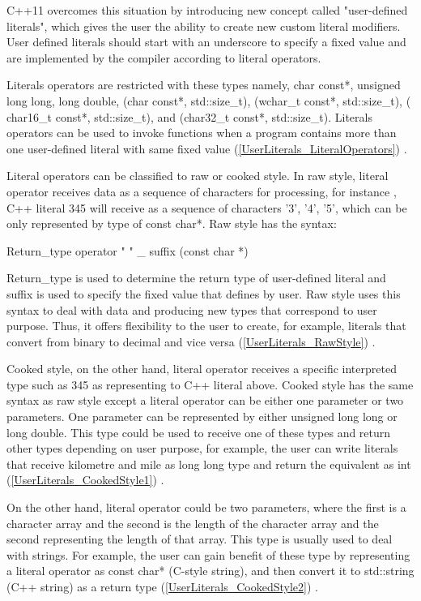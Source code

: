 \documentclass[11pt]{report}
\begin{document}
C++11 overcomes this situation by introducing new concept called "user-defined literals", which gives the user the ability to create new custom literal modifiers. User defined literals should start with an underscore to specify a fixed value and are implemented by the compiler according to literal operators.


Literals operators are restricted with these types namely, char const*, unsigned long long, long double, (char const*, std::size\_t), (wchar\_t const*, std::size\_t), ( char16\_t const*, std::size\_t), and (char32\_t const*, std::size\_t). Literals operators can be used to invoke functions when a program contains more than one user-defined literal with same fixed value (\ref{UserLiterals_LiteralOperators}) \cite{Gregorie:professionalcpp}.


Literal operators can be classified to raw or cooked style. In raw style, literal operator receives data as a sequence of characters for processing, for instance , C++ literal 345 will receive as a sequence of characters '3', '4', '5', which can be only represented by type of  const char*. Raw style has the syntax:
\begin{center}
Return\_type  operator " " \_ suffix (const char *)
\end{center}

Return\_type is used to determine the return type of user-defined literal and suffix is used to specify the fixed value that defines by user. Raw style uses this syntax to deal with data and producing new types that correspond to user purpose.  Thus, it offers flexibility to the user to create, for example, literals that convert from binary to decimal and vice versa (\ref{UserLiterals_RawStyle}) \cite{Gregorie:professionalcpp}.


Cooked style, on the other hand, literal operator receives a specific interpreted type such as 345 as representing to C++ literal above. Cooked style has the same syntax as raw style except a literal operator can be either one parameter or two parameters. One parameter can be represented by either unsigned long long or long double. This type could be used to receive one of these types and return other types depending on user purpose, for example, the user can write literals that receive kilometre and mile as long long type and return the equivalent as int (\ref{UserLiterals_CookedStyle1}) \cite{Gregorie:professionalcpp}.


On the other hand, literal operator could be two parameters, where the first is a character array and the second is the length of the character array and the second representing the length of that array. This type is usually used to deal with strings. For example, the user can gain benefit of these type by representing a literal operator as const char* (C-style string), and then convert it to std::string (C++ string) as a return type (\ref{UserLiterals_CookedStyle2}) \cite{Gregorie:professionalcpp}.
\end{document}
